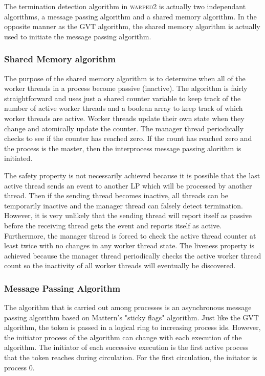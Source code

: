 \documentclass[11pt]{book}
\begin{document}
The termination detection algorithm in \textsc{warped2} is actually two independant algorithms,
a message passing algorithm and a shared memory algorithm. In the opposite manner as the
GVT algorithm, the shared memory algorithm is actually used to initiate the message passing
algorithm.

\subsubsection{Shared Memory algorithm}

The purpose of the shared memory algorithm is to determine when all of the worker threads
in a process become passive (inactive). The algorithm is fairly straightforward and uses
just a shared counter variable to keep track of the number of active worker threads and a
boolean array to keep track of which worker threads are active. Worker threads update their own
state when they change and atomically update the counter. The manager thread periodically
checks to see if the counter has reached zero. If the count has reached zero and the process
is the master, then the interprocess message passing alorithm is initiated.

The safety property is not necessarily achieved because it is possible that the last active
thread sends an event to another LP which will be processed by another thread. Then if the sending
thread becomes inactive, all threads can be temporarily inactive and the manager thread can
falsely detect termination. However, it is very unlikely that the sending thread will report
itself as passive before the receiving thread gets the event and reports itself as active.
Furthermore, the manager thread is forced to check the active thread counter at least twice with
no changes in any worker thread state. The liveness property is achieved because the manager
thread periodically checks the active worker thread count so the inactivity of all worker threads
will eventually be discovered.

\subsubsection{Message Passing Algorithm}

The algorithm that is carried out among processes is an asynchronous message passing
algorithm based on Mattern's "sticky flags" algorithm\cite{mattern-93}. Just like the GVT
algorithm, the token is passed in a logical ring to increasing process ids. However, the
initiator process of the algorithm can change with each execution of the algorithm. The initiator
of each successive execution is the first active process that the token reaches during circulation.
For the first circulation, the initator is process 0.
\end{document}
